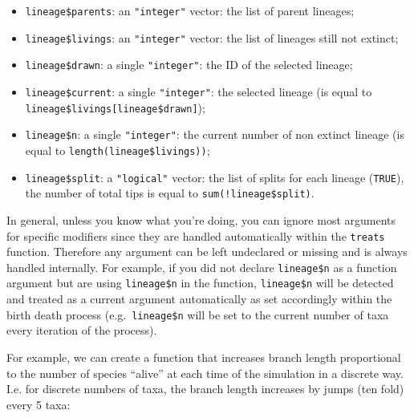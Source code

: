 \documentclass[
]{book}
\providecommand{\tightlist}{%
  \setlength{\itemsep}{0pt}\setlength{\parskip}{0pt}}
\begin{document}
\begin{itemize}
\tightlist
\item
  \texttt{lineage\$parents}: an \texttt{"integer"} vector: the list of parent lineages;
\item
  \texttt{lineage\$livings}: an \texttt{"integer"} vector: the list of lineages still not extinct;
\item
  \texttt{lineage\$drawn}: a single \texttt{"integer"}: the ID of the selected lineage;
\item
  \texttt{lineage\$current}: a single \texttt{"integer"}: the selected lineage (is equal to \texttt{lineage\$livings{[}lineage\$drawn{]}});
\item
  \texttt{lineage\$n}: a single \texttt{"integer"}: the current number of non extinct lineage (is equal to \texttt{length(lineage\$livings))};
\item
  \texttt{lineage\$split}: a \texttt{"logical"} vector: the list of splits for each lineage (\texttt{TRUE}), the number of total tips is equal to \texttt{sum(!lineage\$split)}.
\end{itemize}

In general, unless you know what you're doing, you can ignore most arguments for specific modifiers since they are handled automatically within the \texttt{treats} function.
Therefore any argument can be left undeclared or missing and is always handled internally. For example, if you did not declare \texttt{lineage\$n} as a function argument but are using \texttt{lineage\$n} in the function, \texttt{lineage\$n} will be detected and treated as a current argument automatically as set accordingly within the birth death process (e.g.~\texttt{lineage\$n} will be set to the current number of taxa every iteration of the process).

For example, we can create a function that increases branch length proportional to the number of species ``alive'' at each time of the simulation in a discrete way. I.e. for discrete numbers of taxa, the branch length increases by jumps (ten fold) every 5 taxa:
\end{document}
